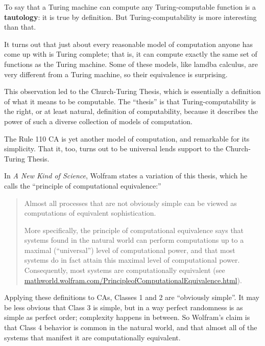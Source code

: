 \documentclass[12pt]{book}
\theoremstyle{exercise}
\begin{document}

To say that a Turing machine can compute any Turing-computable
function is a {\bf tautology}: it is true by definition.  But
Turing-computability is more interesting than that.


It turns out that just about every reasonable model of computation
anyone has come up with is Turing complete; that is, it can compute
exactly the same set of functions as the Turing machine.
Some of these models, like lamdba calculus, are very different
from a Turing machine, so their equivalence is surprising.


This observation led to the Church-Turing Thesis, which is essentially
a definition of what it means to be computable.  The ``thesis'' is
that Turing-computability is the right, or at least natural,
definition of computability, because it describes the power of such a
diverse collection of models of computation.

The Rule 110 CA is yet another model of computation, and remarkable
for its simplicity.  That it, too, turns out to be universal lends
support to the Church-Turing Thesis.

In {\em A New Kind of Science}, Wolfram states a variation of this
thesis, which he calls the ``principle of computational equivalence:''


\begin{quote}
Almost all processes that are not obviously simple can be viewed as
computations of equivalent sophistication.

More specifically, the principle of computational equivalence says
that systems found in the natural world can perform computations up to
a maximal (``universal'') level of computational power, and that most
systems do in fact attain this maximal level of computational
power. Consequently, most systems are computationally
equivalent (see
  \url{mathworld.wolfram.com/PrincipleofComputationalEquivalence.html}).
\end{quote}

Applying these definitions to CAs, Classes 1 and 2 are ``obviously
simple''.  It may be less obvious that Class 3 is simple, but in a way
perfect randomness is as simple as perfect order; complexity happens
in between.  So Wolfram's claim is that Class 4 behavior is common in
the natural world, and that almost all of the systems that manifest it
are computationally equivalent.
\end{document}
